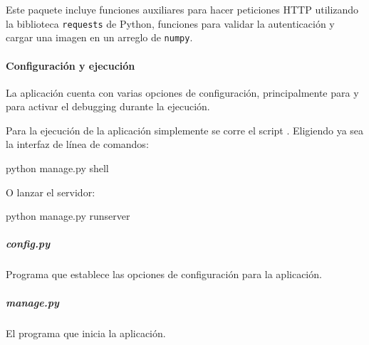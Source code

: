 Este paquete incluye funciones auxiliares
para hacer peticiones HTTP utilizando la biblioteca 
\texttt{requests} de Python, funciones para validar
la autenticación y cargar una imagen en un arreglo
de \texttt{numpy}.


\paragraph{Configuración y ejecución}
\label{\detokenize{chapter_two/desc_cloudnao:configuracion-y-ejecucion}}
La aplicación cuenta con varias opciones de configuración, principalmente
para  y para activar el debugging durante la ejecución.

Para la ejecución de la aplicación simplemente se corre el
script . Eligiendo ya sea la interfaz de línea de comandos:

\begin{sphinxVerbatim}[commandchars=\\\{\}]
\PYGZdl{} python manage.py shell
\end{sphinxVerbatim}

O lanzar el servidor:

\begin{sphinxVerbatim}[commandchars=\\\{\}]
\PYGZdl{} python manage.py runserver
\end{sphinxVerbatim}


\subparagraph{config.py}
\label{\detokenize{chapter_two/desc_cloudnao:config-py}}\label{\detokenize{chapter_two/desc_cloudnao:module-config}}
Programa que establece las opciones de configuración para la
aplicación.


\subparagraph{manage.py}
\label{\detokenize{chapter_two/desc_cloudnao:module-manage}}\label{\detokenize{chapter_two/desc_cloudnao:manage-py}}
El programa que inicia la aplicación.

